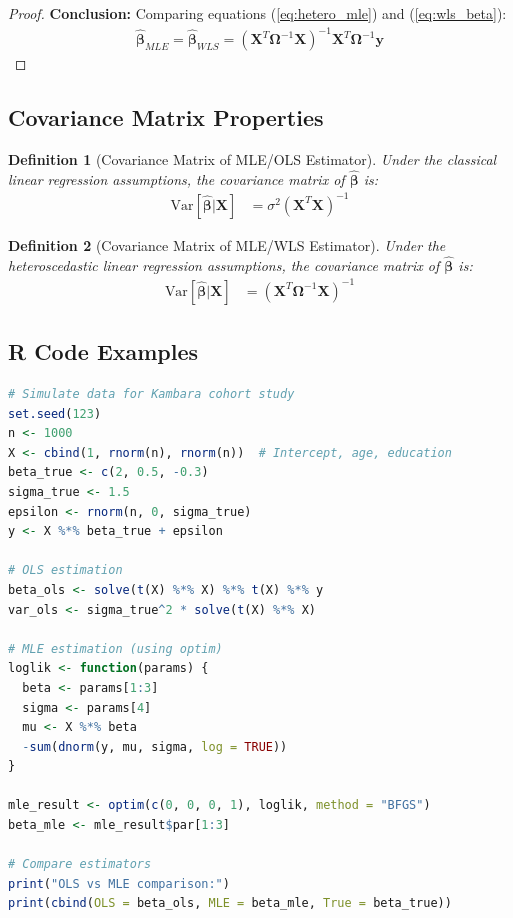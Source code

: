 \documentclass{article}
\newtheorem{definition}{Definition}
\begin{document}
\begin{proof}
\textbf{Conclusion:} Comparing equations (\ref{eq:hetero_mle}) and (\ref{eq:wls_beta}):
\begin{align}
\hat{\boldsymbol{\beta}}_{MLE} = \hat{\boldsymbol{\beta}}_{WLS} = (\mathbf{X}^T\boldsymbol{\Omega}^{-1}\mathbf{X})^{-1}\mathbf{X}^T\boldsymbol{\Omega}^{-1}\mathbf{y}
\end{align}

\end{proof}

\subsection{Covariance Matrix Properties}

\begin{definition}[Covariance Matrix of MLE/OLS Estimator]
Under the classical linear regression assumptions, the covariance matrix of $\hat{\boldsymbol{\beta}}$ is:
\begin{align}
\text{Var}[\hat{\boldsymbol{\beta}}|\mathbf{X}] &= \sigma^2(\mathbf{X}^T\mathbf{X})^{-1} \label{eq:cov_ols}
\end{align}
\end{definition}

\begin{definition}[Covariance Matrix of MLE/WLS Estimator]
Under the heteroscedastic linear regression assumptions, the covariance matrix of $\hat{\boldsymbol{\beta}}$ is:
\begin{align}
\text{Var}[\hat{\boldsymbol{\beta}}|\mathbf{X}] &= (\mathbf{X}^T\boldsymbol{\Omega}^{-1}\mathbf{X})^{-1} \label{eq:cov_wls}
\end{align}
\end{definition}

\subsection{R Code Examples}

\begin{lstlisting}[language=R, caption=OLS and MLE Comparison for Classical Linear Regression]
# Simulate data for Kambara cohort study
set.seed(123)
n <- 1000
X <- cbind(1, rnorm(n), rnorm(n))  # Intercept, age, education
beta_true <- c(2, 0.5, -0.3)
sigma_true <- 1.5
epsilon <- rnorm(n, 0, sigma_true)
y <- X %*% beta_true + epsilon

# OLS estimation
beta_ols <- solve(t(X) %*% X) %*% t(X) %*% y
var_ols <- sigma_true^2 * solve(t(X) %*% X)

# MLE estimation (using optim)
loglik <- function(params) {
  beta <- params[1:3]
  sigma <- params[4]
  mu <- X %*% beta
  -sum(dnorm(y, mu, sigma, log = TRUE))
}

mle_result <- optim(c(0, 0, 0, 1), loglik, method = "BFGS")
beta_mle <- mle_result$par[1:3]

# Compare estimators
print("OLS vs MLE comparison:")
print(cbind(OLS = beta_ols, MLE = beta_mle, True = beta_true))
\end{lstlisting}
\end{document}
